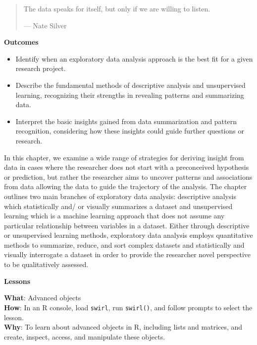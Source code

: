 \documentclass[
  letterpaper,
]{latex/krantz}
\providecommand{\tightlist}{%
  \setlength{\itemsep}{0pt}\setlength{\parskip}{0pt}}\usepackage{longtable,booktabs,array}
\theoremstyle{definition}
\theoremstyle{remark}
\begin{document}
\begin{quote}
The data speaks for itself, but only if we are willing to listen.

--- Nate Silver
\end{quote}

\begin{tcolorbox}[enhanced jigsaw, breakable, leftrule=.75mm, arc=.35mm, colframe=quarto-callout-color-frame, colback=white, left=2mm, bottomrule=.15mm, rightrule=.15mm, toprule=.15mm, opacityback=0]

\textbf{ Outcomes}

\begin{itemize}
\tightlist
\item
  Identify when an exploratory data analysis approach is the best fit
  for a given research project.
\item
  Describe the fundamental methods of descriptive analysis and
  unsupervised learning, recognizing their strengths in revealing
  patterns and summarizing data.
\item
  Interpret the basic insights gained from data summarization and
  pattern recognition, considering how these insights could guide
  further questions or research.
\end{itemize}

\end{tcolorbox}

In this chapter, we examine a wide range of strategies for deriving
insight from data in cases where the researcher does not start with a
preconceived hypothesis or prediction, but rather the researcher aims to
uncover patterns and associations from data allowing the data to guide
the trajectory of the analysis. The chapter outlines two main branches
of exploratory data analysis: descriptive analysis which statistically
and/ or visually summarizes a dataset and unsupervised learning which is
a machine learning approach that does not assume any particular
relationship between variables in a dataset. Either through descriptive
or unsupervised learning methods, exploratory data analysis employs
quantitative methods to summarize, reduce, and sort complex datasets and
statistically and visually interrogate a dataset in order to provide the
researcher novel perspective to be qualitatively assessed.

\begin{tcolorbox}[enhanced jigsaw, breakable, leftrule=.75mm, arc=.35mm, colframe=quarto-callout-color-frame, colback=white, left=2mm, bottomrule=.15mm, rightrule=.15mm, toprule=.15mm, opacityback=0]

\textbf{ Lessons}

\textbf{What}: Advanced objects\\
\textbf{How}: In an R console, load \texttt{swirl}, run
\texttt{swirl()}, and follow prompts to select the lesson.\\
\textbf{Why}: To learn about advanced objects in R, including lists and
matrices, and create, inspect, access, and manipulate these objects.

\end{tcolorbox}
\end{document}
